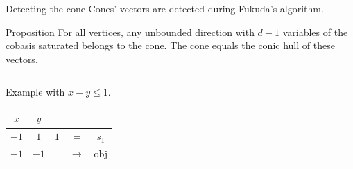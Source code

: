 \begin{frame}{Detecting the cone}
Cones' vectors are detected during Fukuda's algorithm.
\begin{block}{Proposition}
For all vertices, any unbounded direction with $d-1$ variables of the cobasis saturated belongs to the cone. The cone equals the conic hull of these vectors.
\end{block}


\vspace*{0.1cm}

\begin{columns}[c]
\begin{column}{5.5cm}
Example with $x-y\leq 1$.\\

\begin{tabular}{| c | c | c || c c |}
	\hline	
	$x$ & $y$ & & & \\
	\hline	
  	$-1$ & $1$ & $1$ & = & $s_1$\\ \hline	
   	$-1$ & $-1$ & & $\rightarrow$ & obj \\ \hline 
\end{tabular}

\vspace*{0.1cm}




\end{column}
\end{columns}
\end{frame}
